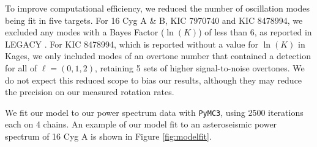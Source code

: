 \documentclass[12pt]{article}
\begin{document}
To improve computational efficiency, we reduced the number of oscillation modes being fit in five targets. For 16 Cyg A \& B, KIC 7970740 and KIC 8478994, we excluded any modes with a Bayes Factor ($\ln(K)$) of less than 6, as reported in LEGACY \cite{kass+raftery1995,davies+2016,lund+2017}. For KIC 8478994, which is reported without a value for $\ln(K)$ in Kages, we only included modes of an overtone number that contained a detection for all of $\ell = (0, 1, 2)$, retaining 5 sets of higher signal-to-noise overtones. We do not expect this reduced scope to bias our results, although they may reduce the precision on our measured rotation rates.

We fit our model to our power spectrum data with \texttt{PyMC3}, using 2500 iterations each on 4 chains. An example of our model fit to an asteroseismic power spectrum of 16 Cyg A is shown in Figure \ref{fig:modelfit}.



\end{document}
